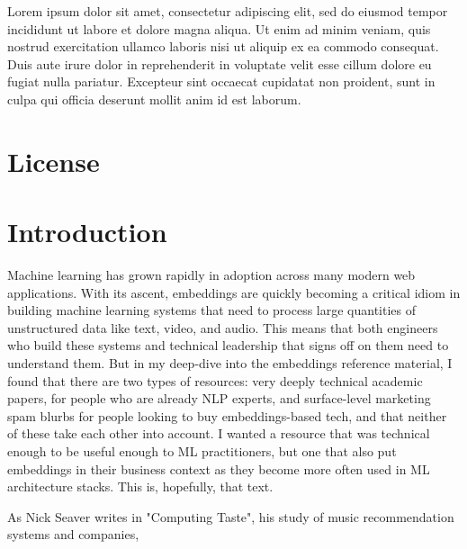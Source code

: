 \documentclass[11pt]{diazessay} %
\begin{document}
Lorem ipsum dolor sit amet, consectetur adipiscing elit, sed do eiusmod tempor incididunt ut labore et dolore magna aliqua. Ut enim ad minim veniam, quis nostrud exercitation ullamco laboris nisi ut aliquip ex ea commodo consequat. Duis aute irure dolor in reprehenderit in voluptate velit esse cillum dolore eu fugiat nulla pariatur. Excepteur sint occaecat cupidatat non proident, sunt in culpa qui officia deserunt mollit anim id est laborum.


\section*{License}
\doclicenseThis
\newpage

\tableofcontents
\newpage


\section{Introduction}

Machine learning has grown rapidly in adoption across many modern web applications. With its ascent, embeddings are quickly becoming a critical idiom in building machine learning systems that need to process large quantities of unstructured data like text, video, and audio. This means that both engineers who build these systems and technical leadership that signs off on them need to understand them.  But in my deep-dive into the embeddings reference material, I found that there are two types of resources: very deeply technical academic papers, for people who are already NLP experts, and surface-level marketing spam blurbs for people looking to buy embeddings-based tech, and that neither of these take each other into account.  I wanted a resource that was technical enough to be useful enough to ML practitioners, but one that also put embeddings in their business context as they become more often used in ML architecture stacks. This is, hopefully, that text. 

As Nick Seaver \citep{seaver2022computing} writes in "Computing Taste", his study of music recommendation systems and companies,
\end{document}
